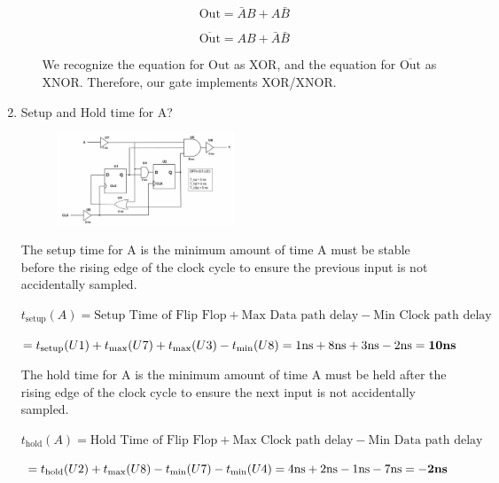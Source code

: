 \documentclass[fleqn]{article}
\begin{document}
\begin{enumerate}
\begin{enumerate}
			\begin{equation*}
				\text{Out} = \bar{A}B + A\bar{B}
			\end{equation*}
			
			\begin{equation*}
				\overline{\text{Out}} = AB + \bar{A}\bar{B}
			\end{equation*}
			
			We recognize the equation for $\text{Out}$ as XOR, and the equation for $\overline{\text{Out}}$ as XNOR. Therefore, our gate implements XOR/XNOR.
			
			\end{enumerate}
			
		\item Setup and Hold time for A?
		
			\begin{figure}[H]
				\centerline{\includegraphics[width=0.5\textwidth]{circuit5.png}}
				\label{fig::circuit5}
			\end{figure}
			
			The setup time for A is the minimum amount of time A must be stable before the rising edge of the clock cycle to ensure the previous input is not accidentally sampled.
			
			$t_{\text{setup}}(A) = \text{Setup Time of Flip Flop} + \text{Max Data path delay} - \text{Min Clock path delay}$
			
			$ = t_{\text{setup}}(U1) + t_{\text{max}}(U7) + t_{\text{max}}(U3) - t_{\text{min}}(U8) = 1\text{ns} + 8\text{ns} + 3\text{ns} - 2\text{ns} = \mathbf{10\text{\textbf{ns}}}$
			
			The hold time for A is the minimum amount of time A must be held after the rising edge of the clock cycle to ensure the next input is not accidentally sampled.
			
			$t_{\text{hold}}(A) = \text{Hold Time of Flip Flop} + \text{Max Clock path delay} - \text{Min Data path delay}$
			
			$ = t_\text{hold}(U2) + t_{\text{max}}(U8) - t_{\text{min}}(U7) - t_{\text{min}}(U4) = 4\text{ns} + 2\text{ns} - 1\text{ns} - 7\text{ns} = \mathbf{-2\text{\textbf{ns}}}$
	\end{enumerate}
\end{document}
